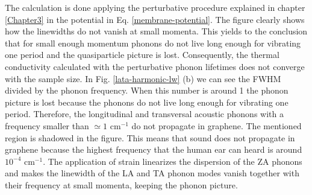 The calculation is done applying the perturbative procedure explained in chapter \ref{Chapter3} in the potential in 
Eq. \ref{membrane-potential}.
The figure clearly shows how the linewidths do not vanish at small momenta. This yields to the conclusion that for 
small enough momentum phonons do not live long enough for vibrating one period and the quasiparticle picture is lost.
Consequently, the thermal conductivity calculated with the perturbative phonon 
lifetimes\cite{fugallo2013ab,fugallo2014thermal} does not converge with the sample size\cite{bonini2012acoustic}. In 
Fig. \ref{lata-harmonic-lw} (b) we can see the FWHM divided by the phonon frequency. When this number is around 1 the 
phonon picture is lost because the phonons do not live long enough for vibrating one period. Therefore, the 
longitudinal and transversal acoustic phonons with a frequency smaller than $\simeq1$ cm$^{-1}$ do not propagate in 
graphene. The mentioned region is shadowed in the figure. This means that 
sound does not propagate in graphene because the highest frequency that the human ear can heard is around $10^{-4}$ 
cm$^{-1}$. The application of strain linearizes the dispersion of the ZA phonons and makes the linewidth of the LA 
and TA phonon modes vanish together with their frequency at small momenta, keeping the phonon 
picture\cite{bonini2012acoustic}. \\

